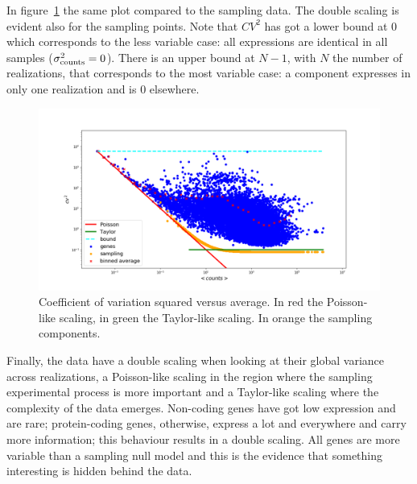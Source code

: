 In figure~\ref{fig:scalinglaws/gtex/cvmean_loglog_sampling} the same plot compared to the sampling data. The double scaling is evident also for the sampling points. Note that $CV^2$ has got a lower bound at $0$ which corresponds to the less variable case: all expressions are identical in all samples ($\sigma^2_{\mathrm{counts}}=0$). There is an upper bound at $N-1$, with $N$ the number of realizations, that corresponds to the most variable case: a component expresses in only one realization and is $0$ elsewhere.
\begin{figure}[htb!]
    \centering
    \includegraphics[width=0.9\linewidth]{pictures/scalinglaws/gtex/cvmean_loglog_sampling.png}
    \caption{Coefficient of variation squared versus average. In \textcolor{pythonred}{red} the Poisson-like scaling, in \textcolor{pythongreen}{green} the Taylor-like scaling. In \textcolor{pythonorange}{orange} the sampling components.}
    \label{fig:scalinglaws/gtex/cvmean_loglog_sampling}
\end{figure}

Finally, the data have a double scaling when looking at their global variance across realizations, a Poisson-like scaling in the region where the sampling experimental process is more important and a Taylor-like scaling where the complexity of the data emerges.
Non-coding genes have got low expression and are rare; protein-coding genes, otherwise, express a lot and everywhere and carry more information; this behaviour results in a double scaling. All genes are more variable than a sampling null model and this is the evidence that something interesting is hidden behind the data.
